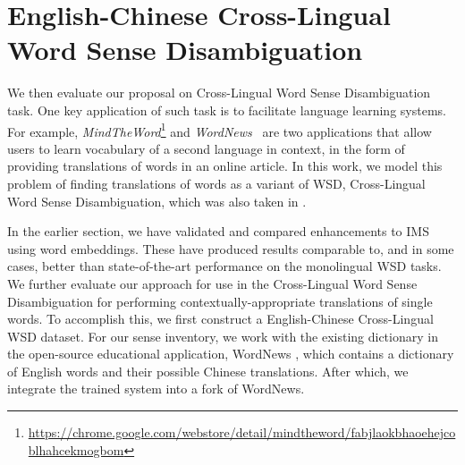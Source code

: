 \section{English-Chinese Cross-Lingual Word Sense Disambiguation}
\label{section:CLWSD}





We then evaluate our proposal on Cross-Lingual Word Sense Disambiguation task.
One key application of such task is to facilitate language learning systems.  
For example, {\it MindTheWord}\footnote{\url{https://chrome.google.com/webstore/detail/mindtheword/fabjlaokbhaoehejcoblhahcekmogbom}} and {\it WordNews}~\cite{tao2014} are two applications that allow users to learn vocabulary of a second language in context, in the form of providing translations of words in an online article.
In this work, we model this problem of finding translations of words as a variant of WSD, Cross-Lingual Word Sense Disambiguation, which was also taken in \cite{tao2014}.

In the earlier section, we have validated and compared enhancements to IMS using word embeddings. These have produced results comparable to, and in some cases, better than state-of-the-art performance on the monolingual WSD tasks. We further evaluate our approach for use in the Cross-Lingual Word Sense Disambiguation for performing contextually-appropriate translations of single words. To accomplish this, we first construct a English-Chinese Cross-Lingual WSD dataset. For our sense inventory, we work with the existing dictionary in the open-source educational application, WordNews \cite{tao2014}, which contains a dictionary of English words and their possible Chinese translations. After which, we integrate the trained system into a fork of WordNews. 


